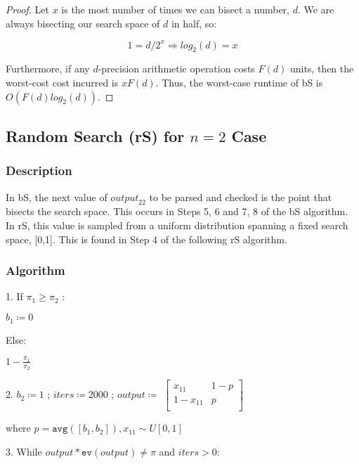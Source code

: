 \documentclass{article}
\begin{document}
\begin{proof}
    Let $x$ is the most number of times we can bisect a number, $d$. We are always bisecting our search space of $d$ in half, so:

    \[
    1 = d / 2^x \Rightarrow log_2(d) = x
    \]

    Furthermore, if any $d$-precision arithmetic operation costs $F(d)$ units, then the worst-cost cost incurred is $xF(d)$. Thus, the worst-case runtime of bS is $O(F(d)log_2(d))$.
\end{proof}

\subsection{Random Search (rS) for $n=2$ Case}
\subsubsection{Description}
In bS, the next value of $\textit{output}_{22}$ to be parsed and checked is the point that bisects the search space. This occurs in Steps 5, 6 and 7, 8 of the bS algorithm. In rS, this value is sampled from a uniform distribution spanning a fixed search space, [0,1]. This is found in Step 4 of the following rS algorithm.

\subsubsection{Algorithm}
1. If $\pi_1 \geq \pi_2$ :

\hspace{1cm} $b_1 \coloneqq 0$

\hspace{4mm}Else:

\hspace{1cm}$1-\frac{\pi_1}{\pi_2}$

2. $b_2 \coloneqq 1$ ; $iters \coloneqq 2000$ ; $output \coloneqq $
$\begin{bmatrix}
    x_{11}       & 1-p \\
    1-x_{11}       & p \\
\end{bmatrix}$

\hspace{4mm}where $p = \texttt{avg}([b_1, b_2]), x_{11} \sim U[0,1]$

3. While $output*\texttt{ev}(output) \neq \pi$ and $iters > 0$:
\end{document}
